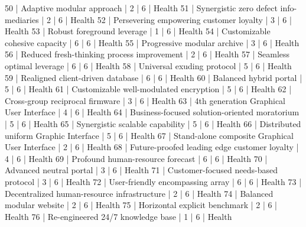 \begin{enumerate}
\begin{pseudo*}
      50 | Adaptive modular approach                        |        2 |      6 | Health        
      51 | Synergistic zero defect info-mediaries           |        2 |      6 | Health        
      52 | Persevering empowering customer loyalty          |        3 |      6 | Health        
      53 | Robust foreground leverage                       |        1 |      6 | Health        
      54 | Customizable cohesive capacity                   |        6 |      6 | Health        
      55 | Progressive modular archive                      |        3 |      6 | Health        
      56 | Reduced fresh-thinking process improvement       |        2 |      6 | Health        
      57 | Seamless optimal leverage                        |        6 |      6 | Health        
      58 | Universal exuding protocol                       |        5 |      6 | Health        
      59 | Realigned client-driven database                 |        6 |      6 | Health        
      60 | Balanced hybrid portal                           |        5 |      6 | Health        
      61 | Customizable well-modulated encryption           |        5 |      6 | Health        
      62 | Cross-group reciprocal firmware                  |        3 |      6 | Health        
      63 | 4th generation Graphical User Interface          |        4 |      6 | Health        
      64 | Business-focused solution-oriented moratorium    |        5 |      6 | Health        
      65 | Synergistic scalable capability                  |        5 |      6 | Health        
      66 | Distributed uniform Graphic Interface            |        5 |      6 | Health        
      67 | Stand-alone composite Graphical User Interface   |        2 |      6 | Health        
      68 | Future-proofed leading edge customer loyalty     |        4 |      6 | Health        
      69 | Profound human-resource forecast                 |        6 |      6 | Health        
      70 | Advanced neutral portal                          |        3 |      6 | Health        
      71 | Customer-focused needs-based protocol            |        3 |      6 | Health        
      72 | User-friendly encompassing array                 |        6 |      6 | Health        
      73 | Decentralized human-resource infrastructure      |        2 |      6 | Health        
      74 | Balanced modular website                         |        2 |      6 | Health        
      75 | Horizontal explicit benchmark                    |        2 |      6 | Health        
      76 | Re-engineered 24/7 knowledge base                |        1 |      6 | Health        

\end{pseudo*}
\end{enumerate}
